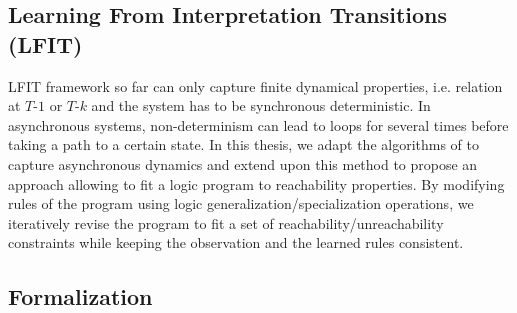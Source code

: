 \subsection{Learning From Interpretation Transitions (LFIT)}\label{sec:lfit}
LFIT framework so far can only capture finite dynamical properties, i.e. relation at $T$-$1$ or $T$-$k$ and the system has to be synchronous deterministic.
In asynchronous systems, non-determinism can lead to loops for several times before taking a path to a certain state.
In this thesis, we adapt the algorithms of \cite{ribeiro2015learning,DMTRICLP15} to capture asynchronous dynamics and extend upon this method to propose an approach allowing to fit a logic program to reachability properties.
By modifying rules of the program using logic generalization/specialization operations, we iteratively revise the program to fit a set of reachability/unreachability constraints while keeping the observation and the learned rules consistent.

\subsection{Formalization}
    
